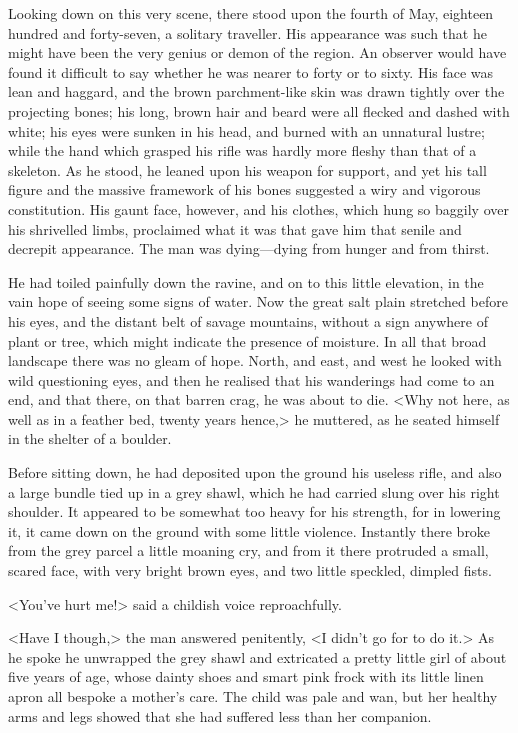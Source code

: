 Looking down on this very scene, there stood upon the fourth of May, eighteen hundred and forty-seven, a solitary traveller. His appearance was such that he might have been the very genius or demon of the region. An observer would have found it difficult to say whether he was nearer to forty or to sixty. His face was lean and haggard, and the brown parchment-like skin was drawn tightly over the projecting bones; his long, brown hair and beard were all flecked and dashed with white; his eyes were sunken in his head, and burned with an unnatural lustre; while the hand which grasped his rifle was hardly more fleshy than that of a skeleton. As he stood, he leaned upon his weapon for support, and yet his tall figure and the massive framework of his bones suggested a wiry and vigorous constitution. His gaunt face, however, and his clothes, which hung so baggily over his shrivelled limbs, proclaimed what it was that gave him that senile and decrepit appearance. The man was dying—dying from hunger and from thirst.

He had toiled painfully down the ravine, and on to this little elevation, in the vain hope of seeing some signs of water. Now the great salt plain stretched before his eyes, and the distant belt of savage mountains, without a sign anywhere of plant or tree, which might indicate the presence of moisture. In all that broad landscape there was no gleam of hope. North, and east, and west he looked with wild questioning eyes, and then he realised that his wanderings had come to an end, and that there, on that barren crag, he was about to die. <Why not here, as well as in a feather bed, twenty years hence,> he muttered, as he seated himself in the shelter of a boulder.

Before sitting down, he had deposited upon the ground his useless rifle, and also a large bundle tied up in a grey shawl, which he had carried slung over his right shoulder. It appeared to be somewhat too heavy for his strength, for in lowering it, it came down on the ground with some little violence. Instantly there broke from the grey parcel a little moaning cry, and from it there protruded a small, scared face, with very bright brown eyes, and two little speckled, dimpled fists.

<You've hurt me!> said a childish voice reproachfully.

<Have I though,> the man answered penitently, <I didn't go for to do it.> As he spoke he unwrapped the grey shawl and extricated a pretty little girl of about five years of age, whose dainty shoes and smart pink frock with its little linen apron all bespoke a mother's care. The child was pale and wan, but her healthy arms and legs showed that she had suffered less than her companion.


